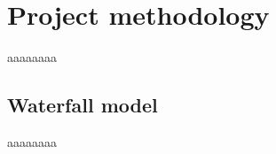 \section{Project methodology}
\label{sec:proj-meth}
aaaaaaaa

\subsection{Waterfall model}
\label{sec:waterfall-model}
aaaaaaaa

